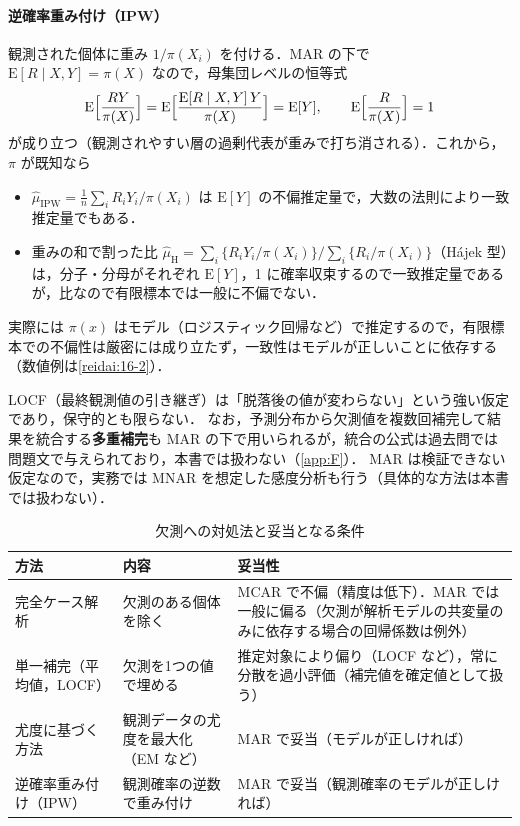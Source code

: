 \documentclass[a4paper,11pt,openany]{ltjsbook}
\newcommand{\tagbox}[2]{\tcbox[on line,boxsep=0.5pt,left=2pt,right=2pt,top=0.5pt,bottom=0.5pt,
  colframe=#1,colback=#1!10,boxrule=0.4pt,arc=1pt]{\scriptsize\bfseries\textcolor{#1}{#2}}}
\newcommand{\Youchui}{\tagbox{bkpurple}{要注意}}
\newcommand{\E}{\mathrm{E}}
\begin{document}
\paragraph{逆確率重み付け（IPW）}
観測された個体に重み $1/\pi(X_i)$ を付ける．MAR の下で $\E[R\mid X,Y]=\pi(X)$ なので，母集団レベルの恒等式
\[
\E\Bigl[\frac{RY}{\pi(X)}\Bigr]=\E\Bigl[\frac{\E[R\mid X,Y]\,Y}{\pi(X)}\Bigr]=\E[Y],\qquad \E\Bigl[\frac{R}{\pi(X)}\Bigr]=1
\]
が成り立つ（観測されやすい層の過剰代表が重みで打ち消される）．これから，$\pi$ が既知なら
\begin{itemize}
\item $\hat\mu_{\mathrm{IPW}}=\frac1n\sum_iR_iY_i/\pi(X_i)$ は $\E[Y]$ の不偏推定量で，大数の法則により一致推定量でもある．
\item 重みの和で割った比 $\hat\mu_{\mathrm{H}}=\sum_i\{R_iY_i/\pi(X_i)\}\big/\sum_i\{R_i/\pi(X_i)\}$（Hájek 型）は，分子・分母がそれぞれ $\E[Y]$，1 に確率収束するので一致推定量であるが，比なので有限標本では一般に不偏でない．
\end{itemize}
実際には $\pi(x)$ はモデル（ロジスティック回帰など）で推定するので，有限標本での不偏性は厳密には成り立たず，一致性はモデルが正しいことに依存する（数値例は\cref{reidai:16-2}）．

\Youchui LOCF（最終観測値の引き継ぎ）は「脱落後の値が変わらない」という強い仮定であり，保守的とも限らない．
なお，予測分布から欠測値を複数回補完して結果を統合する\textbf{多重補完}も MAR の下で用いられるが，統合の公式は過去問では問題文で与えられており，本書では扱わない（\cref{app:F}）．
MAR は検証できない仮定なので，実務では MNAR を想定した感度分析も行う（具体的な方法は本書では扱わない）．

\begin{table}[htbp]
\centering\small
\caption{欠測への対処法と妥当となる条件}\label{tab:16-methods}
\begin{tabular}{@{}lL{48mm}L{52mm}@{}}
\toprule
方法 & 内容 & 妥当性\\
\midrule
完全ケース解析 & 欠測のある個体を除く & MCAR で不偏（精度は低下）．MAR では一般に偏る（欠測が解析モデルの共変量のみに依存する場合の回帰係数は例外）\\
単一補完（平均値，LOCF） & 欠測を1つの値で埋める & 推定対象により偏り（LOCF など），常に分散を過小評価（補完値を確定値として扱う）\\
尤度に基づく方法 & 観測データの尤度を最大化（EM など） & MAR で妥当（モデルが正しければ）\\
逆確率重み付け（IPW） & 観測確率の逆数で重み付け & MAR で妥当（観測確率のモデルが正しければ）\\
\bottomrule
\end{tabular}
\end{table}
\end{document}
